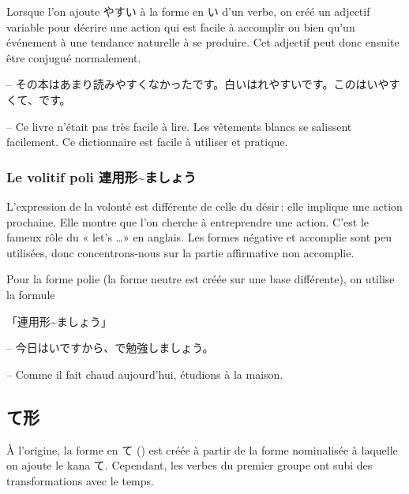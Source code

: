 Lorsque l'on ajoute やすい à la forme en い d'un verbe, on créé un adjectif variable pour décrire une action qui est facile à accomplir ou bien qu'un événement à une tendance naturelle à se produire. Cet adjectif peut donc ensuite être conjugué normalement.

\begin{tcolorbox}
    -- その本はあまり読みやすくなかったです。白いはれやすいです。このはいやすくて、です。

    -- Ce livre n'était pas très facile à lire. Les vêtements blancs se salissent facilement. Ce dictionnaire est facile à utiliser et pratique.
\end{tcolorbox}

\subsubsection{Le volitif poli 連用形\~{}ましょう}

L'expression de la volonté est différente de celle du désir : elle implique une action prochaine. Elle montre que l'on cherche à entreprendre une action. C'est le fameux rôle du « let's \dots » en anglais. Les formes négative et accomplie sont peu utilisées, donc concentrons-nous sur la partie affirmative non accomplie.

Pour la forme polie (la forme neutre est créée sur une base différente), on utilise la formule
\begin{center}
    「連用形\~{}\textcolor{couleurmatiere}{ましょう}」
\end{center}

\begin{tcolorbox}
    -- 今日はいですから、で勉強しましょう。

    -- Comme il fait chaud aujourd'hui, étudions à la maison.
\end{tcolorbox}

\subsection{て形}

À l'origine, la forme en て () est créée à partir de la forme nominalisée à laquelle on ajoute le kana て. Cependant, les verbes du premier groupe ont subi des transformations avec le temps.

